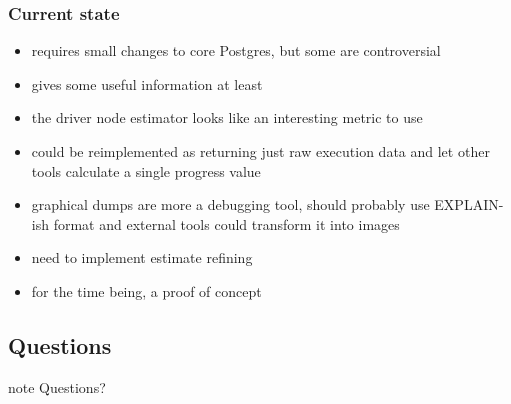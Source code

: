 \documentclass{beamer}
\begin{document}
\begin{frame}
  \frametitle{Current state}

  \begin{itemize}
  \item requires small changes to core Postgres, but some are controversial
  \item gives some useful information at least
  \item the driver node estimator looks like an interesting metric to use
  \item could be reimplemented as returning just raw execution data and let
    other tools calculate a single progress value
  \item graphical dumps are more a debugging tool, should probably use
    EXPLAIN-ish format and external tools could transform it into images
  \item need to implement estimate refining
  \item for the time being, a proof of concept
  \end{itemize}
\end{frame}

\subsection*{Questions}

\begin{frame}
\begin{beamercolorbox}[center]{note}
  \Huge Questions?
\end{beamercolorbox}
\end{frame}
\end{document}
